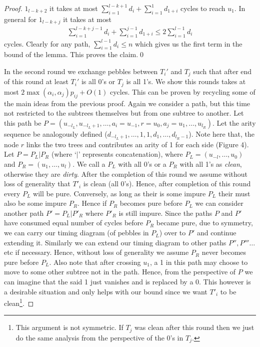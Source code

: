 \documentclass[runningheads,a4paper]{llncs}
\begin{document}
\begin{proof}
$1_{l-k+2}$ it takes at most $\sum_{i=1}^{l-k+1}{d_i} + \sum_{i=1}^{1}{d_{1+i}}$ cycles to reach $u_1$. In general for $1_{l-k+j}$ it takes at most 
	\begin{align}
	\sum_{i=1}^{l-k+j-1}{d_i} + \sum_{i=1}^{j-1}{d_{1+i}} \le 2\sum_{i=1}^{l-1}{d_i}
	\end{align}
	cycles. Clearly for any path, $\sum_{i=1}^{l-1}{d_i} \le n$ which gives us the first term in  the bound of the lemma. This proves the claim.\qed
	
	In the second round we exchange pebbles between $T_i'$ and $T_j$ such that after end of this round at least $T_i'$ is all 0's or $T_j$ is all 1's. We show this rounds takes at most $2\max(\alpha_i,\alpha_j)p_{ij} + O(1)$ cycles. This can be proven by recycling some of the main ideas from the previous proof. Again we  consider a path, but this time not restricted to the subtrees themselves but from one subtree to another. Let this path be $P = (u_{-l_L},u_{-l_L+1},\ldots,a_i=u_{-1},r=u_0,a_j=u_1,\ldots,u_{l_R})$. Let the arity sequence be analogously defined ($d_{-l_L+1},\ldots,1,1,d_1,\ldots,d_{l_R - 1}$). Note here that, the node $r$ links the two trees and contributes an arity of 1 for each side (Figure 4). Let $P = P_L | P_R$ (where `$|$' represents concatenation), where $P_L= (u_{-l},\ldots,u_0)$ and $P_R = (u_1,\ldots,u_l)$.  We call a $P_L$ with all 0's or a $P_R$ with all 1's as \textit{clean}, otherwise they are \textit{dirty}. After the completion of this round we assume without loss of generality that $T'_i$ is clean (all 0's). Hence, after completion of this round every $P_L$ will be pure. Conversely, as long as their is some impure $P_L$ their must also be some impure $P_R$. Hence if $P_R$ becomes pure before $P_L$ we can consider another path $P'=P_L | P'_R$ where $P'_R$ is still impure. Since the paths $P$ and $P'$ have consumed equal number of cycles before $P_R$ became pure, due to symmetry, we can carry our timing diagram (of pebbles in $P_L$) over to $P'$ and continue extending it. Similarly we can extend our timing diagram to other paths $P'', P''' \ldots$ etc if necessary. Hence, without loss of generality we assume $P_R$ never becomes pure before $P_L$. Also note that after crossing $u_1$, a 1 in this path may choose to move to some other subtree not in the path. Hence, from the perspective of $P$ we can imagine that the said 1 just vanishes and is replaced by a 0. This however is a desirable situation and only helps with our bound since we want $T'_i$ to be clean\footnote{This argument is not symmetric. If $T_j$ was clean after this round then we just do the same analysis from the perspective of the 0's in $T_j$.}.
	

\end{proof}
\end{document}
